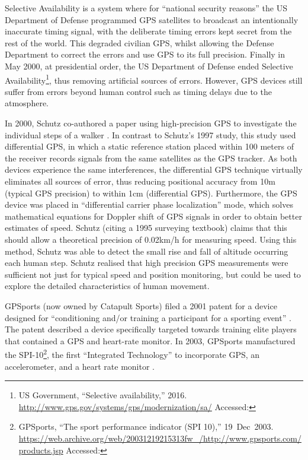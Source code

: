 Selective Availability is a system where for ``national security
reasons'' the US Department of Defense programmed GPS satellites to
broadcast an intentionally inaccurate timing signal, with the deliberate
timing errors kept secret from the rest of the world. This degraded
civilian GPS, whilst allowing the Defense Department to correct the
errors and use GPS to its full precision. Finally in May 2000, at
presidential order, the US Department of Defense ended Selective
Availability\footnote{US Government, ``Selective availability,'' 2016.
  \url{http://www.gps.gov/systems/gps/modernization/sa/} Accessed:
  }, thus removing artificial sources of errors. However, GPS
devices still suffer from errors beyond human control such as timing
delays due to the atmosphere.

In 2000, Schutz co-authored a paper using high-precision GPS to
investigate the individual steps of a walker
\cite{Terrier2000}. In contrast to Schutz's 1997
study, this study used differential GPS, in which a static reference
station placed within 100 meters of the receiver records signals from
the same satellites as the GPS tracker. As both devices experience the
same interferences, the differential GPS technique virtually eliminates
all sources of error, thus reducing positional accuracy from
10\thinspace m (typical GPS precision) %
to within 1\thinspace cm
(differential GPS). Furthermore, the GPS device was placed in
``differential carrier phase localization'' mode, which solves
mathematical equations for Doppler shift of GPS signals in order to
obtain better estimates of speed. Schutz (citing a 1995 surveying
textbook) claims that this should allow a theoretical precision of
0.02\thinspace km/h for measuring speed. Using this method, Schutz was able to detect the
small rise and fall of altitude occurring each human step. Schutz realised that
high precision GPS measurements were sufficient not just for typical
speed and position monitoring, but could be used to explore the detailed
characteristics of human movement.

GPSports (now owned by Catapult Sports) filed a 2001 patent for a device
designed for ``conditioning and/or training a participant for a sporting
event'' \cite{faccioni_information_2002}. The patent described a
device specifically targeted towards training elite players that contained a GPS and heart-rate monitor. %
In 2003, GPSports manufactured
the SPI-10\footnote{GPSports, ``The sport performance indicator (SPI
  10),'' 19~Dec~2003.
  \url{https://web.archive.org/web/20031219215313fw_/http://www.gpsports.com/products.jsp}
  Accessed: }, the first ``Integrated Technology'' to
incorporate GPS, an accelerometer, and a heart rate monitor
\cite{dellaserra_use_2014}.

